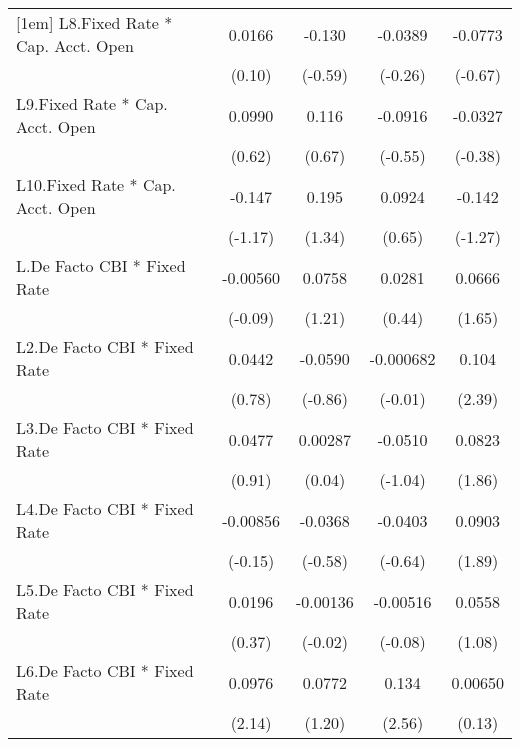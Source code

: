 {\begin{longtable}{l*{4}{c}}
[1em]
L8.Fixed Rate * Cap. Acct. Open&   0.0166         &   -0.130         &  -0.0389         &  -0.0773         \\
                &   (0.10)         &  (-0.59)         &  (-0.26)         &  (-0.67)         \\
[1em]
L9.Fixed Rate * Cap. Acct. Open&   0.0990         &    0.116         &  -0.0916         &  -0.0327         \\
                &   (0.62)         &   (0.67)         &  (-0.55)         &  (-0.38)         \\
[1em]
L10.Fixed Rate * Cap. Acct. Open&   -0.147         &    0.195         &   0.0924         &   -0.142         \\
                &  (-1.17)         &   (1.34)         &   (0.65)         &  (-1.27)         \\
[1em]
L.De Facto CBI * Fixed Rate& -0.00560         &   0.0758         &   0.0281         &   0.0666         \\
                &  (-0.09)         &   (1.21)         &   (0.44)         &   (1.65)         \\
[1em]
L2.De Facto CBI * Fixed Rate&   0.0442         &  -0.0590         &-0.000682         &    0.104\sym{*}  \\
                &   (0.78)         &  (-0.86)         &  (-0.01)         &   (2.39)         \\
[1em]
L3.De Facto CBI * Fixed Rate&   0.0477         &  0.00287         &  -0.0510         &   0.0823         \\
                &   (0.91)         &   (0.04)         &  (-1.04)         &   (1.86)         \\
[1em]
L4.De Facto CBI * Fixed Rate& -0.00856         &  -0.0368         &  -0.0403         &   0.0903         \\
                &  (-0.15)         &  (-0.58)         &  (-0.64)         &   (1.89)         \\
[1em]
L5.De Facto CBI * Fixed Rate&   0.0196         & -0.00136         & -0.00516         &   0.0558         \\
                &   (0.37)         &  (-0.02)         &  (-0.08)         &   (1.08)         \\
[1em]
L6.De Facto CBI * Fixed Rate&   0.0976\sym{*}  &   0.0772         &    0.134\sym{*}  &  0.00650         \\
                &   (2.14)         &   (1.20)         &   (2.56)         &   (0.13)         \\

\end{longtable}}
